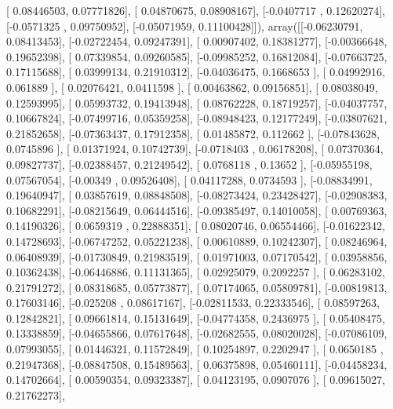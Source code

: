 \documentclass{article}
\begin{document}
       [ 0.08446503,  0.07771826],
       [ 0.04870675,  0.08908167],
       [-0.0407717 ,  0.12620274],
       [-0.0571325 ,  0.09750952],
       [-0.05071959,  0.11100428]]), array([[-0.06230791,  0.08413453],
       [-0.02722454,  0.09247391],
       [ 0.00907402,  0.18381277],
       [-0.00366648,  0.19652398],
       [ 0.07339854,  0.09260585],
       [-0.09985252,  0.16812084],
       [-0.07663725,  0.17115688],
       [ 0.03999134,  0.21910312],
       [-0.04036475,  0.1668653 ],
       [ 0.04992916,  0.061889  ],
       [ 0.02076421,  0.0411598 ],
       [ 0.00463862,  0.09156851],
       [ 0.08038049,  0.12593995],
       [ 0.05993732,  0.19413948],
       [ 0.08762228,  0.18719257],
       [-0.04037757,  0.10667824],
       [-0.07499716,  0.05359258],
       [-0.08948423,  0.12177249],
       [-0.03807621,  0.21852658],
       [-0.07363437,  0.17912358],
       [ 0.01485872,  0.112662  ],
       [-0.07843628,  0.0745896 ],
       [ 0.01371924,  0.10742739],
       [-0.0718403 ,  0.06178208],
       [ 0.07370364,  0.09827737],
       [-0.02388457,  0.21249542],
       [ 0.0768118 ,  0.13652   ],
       [-0.05955198,  0.07567054],
       [-0.00349   ,  0.09526408],
       [ 0.04117288,  0.0734593 ],
       [-0.08834991,  0.19640947],
       [ 0.03857619,  0.08848508],
       [-0.08273424,  0.23428427],
       [-0.02908383,  0.10682291],
       [-0.08215649,  0.06444516],
       [-0.09385497,  0.14010058],
       [ 0.00769363,  0.14190326],
       [ 0.0659319 ,  0.22888351],
       [ 0.08020746,  0.06554466],
       [-0.01622342,  0.14728693],
       [-0.06747252,  0.05221238],
       [ 0.00610889,  0.10242307],
       [ 0.08246964,  0.06408939],
       [-0.01730849,  0.21983519],
       [ 0.01971003,  0.07170542],
       [ 0.03958856,  0.10362438],
       [-0.06446886,  0.11131365],
       [ 0.02925079,  0.2092257 ],
       [ 0.06283102,  0.21791272],
       [ 0.08318685,  0.05773877],
       [ 0.07174065,  0.05809781],
       [-0.00819813,  0.17603146],
       [-0.025208  ,  0.08617167],
       [-0.02811533,  0.22333546],
       [ 0.08597263,  0.12842821],
       [ 0.09661814,  0.15131649],
       [-0.04774358,  0.2436975 ],
       [ 0.05408475,  0.13338859],
       [-0.04655866,  0.07617648],
       [-0.02682555,  0.08020028],
       [-0.07086109,  0.07993055],
       [ 0.01446321,  0.11572849],
       [ 0.10254897,  0.2202947 ],
       [ 0.0650185 ,  0.21947368],
       [-0.08847508,  0.15489563],
       [ 0.06375898,  0.05460111],
       [-0.04458234,  0.14702664],
       [ 0.00590354,  0.09323387],
       [ 0.04123195,  0.0907076 ],
       [ 0.09615027,  0.21762273],
\end{document}
